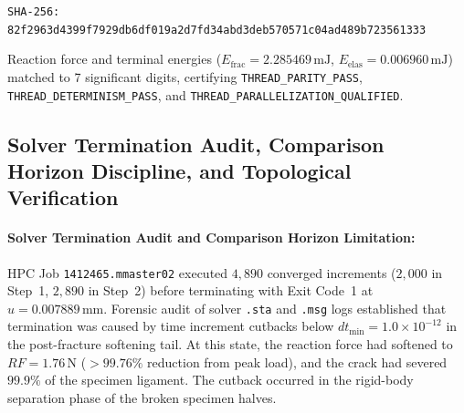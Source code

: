 \begin{enumerate}
  \begin{center}
    \texttt{SHA-256: 82f2963d4399f7929db6df019a2d7fd34abd3deb570571c04ad489b723561333}
  \end{center}
  Reaction force and terminal energies ($E_{\mathrm{frac}} = 2.285469\,\mathrm{mJ}$, $E_{\mathrm{elas}} = 0.006960\,\mathrm{mJ}$) matched to 7 significant digits, certifying \texttt{THREAD\_PARITY\_PASS}, \texttt{THREAD\_DETERMINISM\_PASS}, and \texttt{THREAD\_PARALLELIZATION\_QUALIFIED}.
\end{enumerate}

\subsection{Solver Termination Audit, Comparison Horizon Discipline, and Topological Verification}
\label{subsec:method_b_termination_and_topology}

\paragraph{Solver Termination Audit and Comparison Horizon Limitation:}
HPC Job \texttt{1412465.mmaster02} executed $4{,}890$ converged increments ($2{,}000$ in Step~1, $2{,}890$ in Step~2) before terminating with Exit Code~1 at $u = 0.007889\,\mathrm{mm}$. Forensic audit of solver \texttt{.sta} and \texttt{.msg} logs established that termination was caused by time increment cutbacks below $dt_{\min} = 1.0 \times 10^{-12}$ in the post-fracture softening tail. At this state, the reaction force had softened to $RF = 1.76\,\mathrm{N}$ ($> 99.76\%$ reduction from peak load), and the crack had severed $99.9\%$ of the specimen ligament. The cutback occurred in the rigid-body separation phase of the broken specimen halves.

\begin{center}
\end{center}

